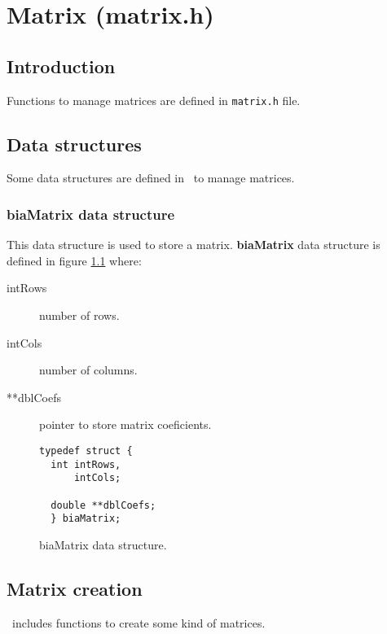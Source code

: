 %
%

\chapter{Matrix (matrix.h)}

\section{Introduction}

Functions to manage matrices are defined in \texttt{matrix.h} file.\\

\section{Data structures}

Some data structures are defined in \BI \ to manage matrices.

\subsection{\textbf{biaMatrix} data structure} \label{sec:biaMatrix}

This data structure is used to store a matrix. \textbf{biaMatrix} data structure is defined in figure \ref{fig:biaMatrix} where:

\begin{description}
\item[intRows] number of rows.
\item[intCols] number of columns.
\item[**dblCoefs] pointer to store matrix coeficients.
\end{description}

\begin{figure}[!h]
\begin{verbatim}
typedef struct {
  int intRows,
      intCols;

  double **dblCoefs;
  } biaMatrix;   
\end{verbatim}
\caption{biaMatrix data structure.} \label{fig:biaMatrix}
\end{figure}

\FloatBarrier

\section{Matrix creation}

\BI \ includes functions to create some kind of matrices.

